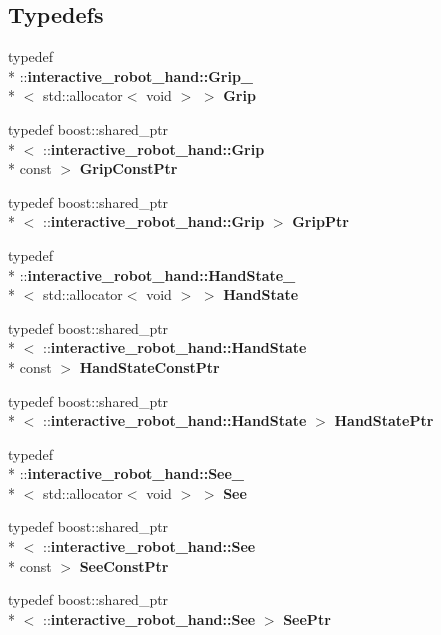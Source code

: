 \subsection*{Typedefs}
\begin{DoxyCompactItemize}
\item 
typedef \\*
\-::{\bf interactive\-\_\-robot\-\_\-hand\-::\-Grip\-\_\-}\\*
$<$ std\-::allocator$<$ void $>$ $>$ {\bf Grip}
\item 
typedef boost\-::shared\-\_\-ptr\\*
$<$ \-::{\bf interactive\-\_\-robot\-\_\-hand\-::\-Grip} \\*
const  $>$ {\bf Grip\-Const\-Ptr}
\item 
typedef boost\-::shared\-\_\-ptr\\*
$<$ \-::{\bf interactive\-\_\-robot\-\_\-hand\-::\-Grip} $>$ {\bf Grip\-Ptr}
\item 
typedef \\*
\-::{\bf interactive\-\_\-robot\-\_\-hand\-::\-Hand\-State\-\_\-}\\*
$<$ std\-::allocator$<$ void $>$ $>$ {\bf Hand\-State}
\item 
typedef boost\-::shared\-\_\-ptr\\*
$<$ \-::{\bf interactive\-\_\-robot\-\_\-hand\-::\-Hand\-State} \\*
const  $>$ {\bf Hand\-State\-Const\-Ptr}
\item 
typedef boost\-::shared\-\_\-ptr\\*
$<$ \-::{\bf interactive\-\_\-robot\-\_\-hand\-::\-Hand\-State} $>$ {\bf Hand\-State\-Ptr}
\item 
typedef \\*
\-::{\bf interactive\-\_\-robot\-\_\-hand\-::\-See\-\_\-}\\*
$<$ std\-::allocator$<$ void $>$ $>$ {\bf See}
\item 
typedef boost\-::shared\-\_\-ptr\\*
$<$ \-::{\bf interactive\-\_\-robot\-\_\-hand\-::\-See} \\*
const  $>$ {\bf See\-Const\-Ptr}
\item 
typedef boost\-::shared\-\_\-ptr\\*
$<$ \-::{\bf interactive\-\_\-robot\-\_\-hand\-::\-See} $>$ {\bf See\-Ptr}
\end{DoxyCompactItemize}
